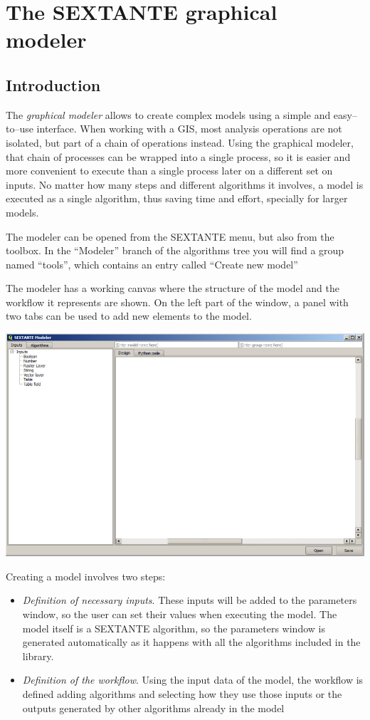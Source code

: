 \chapter{The SEXTANTE graphical modeler}

\section{Introduction}

The \emph{graphical modeler} allows to create complex models using a simple and easy--to--use interface. When working with a GIS, most analysis operations are not isolated, but part of a chain of operations instead. Using the graphical modeler, that chain of processes can be wrapped into a single process, so it is easier and more convenient to execute than a single process later on a different set on inputs. No matter how many steps and different algorithms it involves, a model is executed as a single algorithm, thus saving time and effort, specially for larger models.

The modeler can be opened from the SEXTANTE menu, but also from the toolbox. In the ``Modeler'' branch of the algorithms tree you will find a group named ``tools'', which contains an entry called ``Create new model''

The modeler has a working canvas where the structure of the model and the workflow it represents are shown. On the left part of the window, a panel with two tabs can be used to add new elements to the model.

\begin{center}
\includegraphics[width=.8\columnwidth]{modeler_canvas.png}
\end{center}

Creating a model involves two steps:

\begin{itemize}
	\item \emph{Definition of necessary inputs}. These inputs will be added to the parameters window, so the user can set their values when executing the model. The model itself is a SEXTANTE algorithm, so the parameters window is generated automatically as it happens with all the algorithms included in the library.
	\item \emph{Definition of the workflow}. Using the input data of the model, the workflow is defined adding algorithms and selecting how they use those inputs or the outputs generated by other algorithms already in the model 
\end{itemize}


